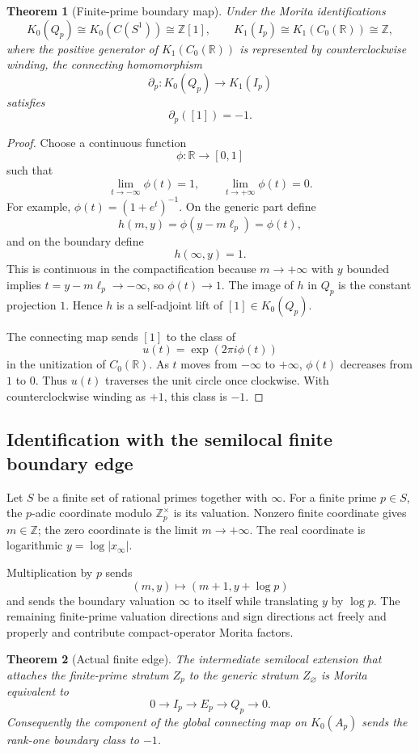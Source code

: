 \documentclass[11pt]{amsart}
\newtheorem{theorem}{Theorem}[section]
\newcommand{\ZZ}{\mathbb Z}
\newcommand{\RR}{\mathbb R}
\begin{document}
\begin{theorem}[Finite-prime boundary map]
Under the Morita identifications
\[
        K_0(Q_p)\cong K_0(C(S^1))\cong\ZZ[1],
        \qquad
        K_1(I_p)\cong K_1(C_0(\RR))\cong\ZZ,
\]
where the positive generator of $K_1(C_0(\RR))$ is represented by counterclockwise winding, the connecting homomorphism
\[
        \partial_p:K_0(Q_p)\to K_1(I_p)
\]
satisfies
\[
        \partial_p([1])=-1.
\]
\end{theorem}

\begin{proof}
Choose a continuous function
\[
        \phi:\RR\to[0,1]
\]
such that
\[
        \lim_{t\to-\infty}\phi(t)=1,
        \qquad
        \lim_{t\to+\infty}\phi(t)=0.
\]
For example, $\phi(t)=(1+e^t)^{-1}$.  On the generic part define
\[
        h(m,y)=\phi(y-m\ell_p)=\phi(t),
\]
and on the boundary define
\[
        h(\infty,y)=1.
\]
This is continuous in the compactification because $m\to+\infty$ with $y$ bounded implies $t=y-m\ell_p\to-\infty$, so $\phi(t)\to1$.  The image of $h$ in $Q_p$ is the constant projection $1$.  Hence $h$ is a self-adjoint lift of $[1]\in K_0(Q_p)$.

The connecting map sends $[1]$ to the class of
\[
        u(t)=\exp(2\pi i\phi(t))
\]
in the unitization of $C_0(\RR)$.  As $t$ moves from $-\infty$ to $+\infty$, $\phi(t)$ decreases from $1$ to $0$.  Thus $u(t)$ traverses the unit circle once clockwise.  With counterclockwise winding as $+1$, this class is $-1$.\end{proof}

\subsection{Identification with the semilocal finite boundary edge}

Let $S$ be a finite set of rational primes together with $\infty$.  For a finite prime $p\in S$, the $p$-adic coordinate modulo $\ZZ_p^\times$ is its valuation.  Nonzero finite coordinate gives $m\in\ZZ$; the zero coordinate is the limit $m\to+\infty$.  The real coordinate is logarithmic $y=\log |x_\infty|$.

Multiplication by $p$ sends
\[
      (m,y)\mapsto(m+1,y+\log p)
\]
and sends the boundary valuation $\infty$ to itself while translating $y$ by $\log p$.  The remaining finite-prime valuation directions and sign directions act freely and properly and contribute compact-operator Morita factors.

\begin{theorem}[Actual finite edge]
The intermediate semilocal extension that attaches the finite-prime stratum $Z_p$ to the generic stratum $Z_\varnothing$ is Morita equivalent to
\[
        0\to I_p\to E_p\to Q_p\to0.
\]
Consequently the component of the global connecting map on $K_0(A_p)$ sends the rank-one boundary class to $-1$.
\end{theorem}
\end{document}
